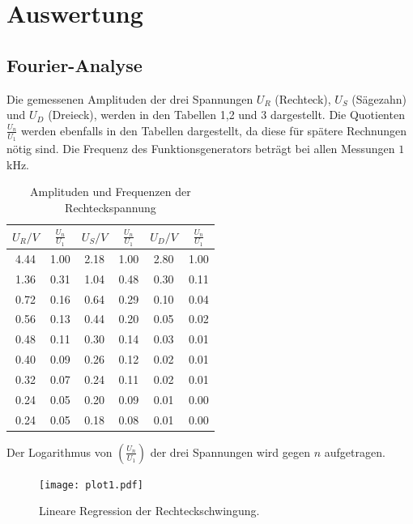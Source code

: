 \section{Auswertung}
\label{sec:Auswertung}

\subsection{Fourier-Analyse}

Die gemessenen Amplituden der drei Spannungen $U_R$ (Rechteck), $U_S$ (Sägezahn) und $U_D$ (Dreieck), werden in den Tabellen 1,2 und 3 dargestellt.
Die Quotienten $\frac{U_n}{U_1}$ werden ebenfalls in den Tabellen dargestellt, da diese für
spätere Rechnungen nötig sind.
Die Frequenz des Funktionsgenerators beträgt bei allen Messungen $1$kHz.

\begin{table}[H]
  \centering
  \caption{Amplituden und Frequenzen der Rechteckspannung}
  \label{tab:Rechteckspannung}
  \begin{tabular}{c c | c c | c c}
    \toprule
    $U_R/V$ & $\frac{U_n}{U_1}$ & $U_S/V$ & $\frac{U_n}{U_1}$ & $U_D/V$ & $\frac{U_n}{U_1}$ \\
    \midrule
    4.44 & 1.00 & 2.18 & 1.00 & 2.80 &  1.00 \\
    1.36 & 0.31 & 1.04 & 0.48 & 0.30 &  0.11\\
    0.72 & 0.16 & 0.64 & 0.29 & 0.10 &  0.04\\
    0.56 & 0.13 & 0.44 & 0.20 & 0.05 &  0.02\\
    0.48 & 0.11 & 0.30 & 0.14 & 0.03 &  0.01\\
    0.40 & 0.09 & 0.26 & 0.12 & 0.02 &  0.01\\
    0.32 & 0.07 & 0.24 & 0.11 & 0.02 &  0.01\\
    0.24 & 0.05 & 0.20 & 0.09 & 0.01 &  0.00\\
    0.24 & 0.05 & 0.18 & 0.08 & 0.01 &  0.00\\
    \bottomrule
  \end{tabular}
\end{table}

Der Logarithmus von $\left( \frac{U_n}{U_1}\right)$ der drei Spannungen wird gegen $n$ aufgetragen.

\begin{figure}
  \centering
  \texttt{[image: plot1.pdf]}
  \caption{Lineare Regression der Rechteckschwingung.}
  \label{fig:rechteck}
\end{figure}

